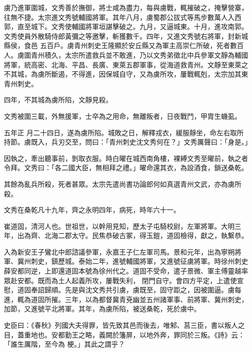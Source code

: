 \begin{pinyinscope}
 虜乃進軍圍城，文秀善於撫御，將士咸為盡力，每與虜戰，輒摧破之，掩擊營寨，往無不捷。太宗進文秀號輔國將軍。其年八月，虜蜀郡公拔式等馬步數萬人入西郭，直至城下。文秀使輔國將軍垣諶擊破之。九月，又逼城東。十月，進攻南郭。文秀使員外散騎侍郎黃彌之等邀擊，斬獲數千。四年，又進文秀號右將軍，封新城縣侯，食邑
 五百戶。虜青州刺史王隆顯於安丘縣又為軍主高崇仁所破，死者數百人。虜圍青州積久，太宗所遣救兵並不敢進，乃以文秀弟徵北中兵參軍文靜為輔國將軍，統高密、北海、平昌、長廣、東萊五郡軍事，從海道救青州。文靜至東萊之不其城，為虜所斷遏，不得進，因保城自守，又為虜所攻，屢戰輒剋，太宗加其東青州刺史。



 四年，不其城為虜所陷，文靜見殺。



 文秀被圍三載，外無援軍，士卒為之用命，無離叛者，日夜戰鬥，甲胄生蟣虱。



 五年正
 月二十四日，遂為虜所陷。城敗之日，解釋戎衣，緩服靜坐，命左右取所持節。虜既入，兵刃交至，問曰：「青州刺史沈文秀何在？」文秀厲聲曰：「身是。」



 因執之，牽出聽事前，剝取衣服。時白曜在城西南角樓，裸縛文秀至曜前，執之者令拜。文秀曰：「各二國大臣，無相拜之禮。」曜命還其衣，為設酒食，鎖送桑乾。



 其餘為亂兵所殺，死者甚眾。太宗先遣尚書功論郎何如真選青州文武，亦為虜所殺。



 文秀在桑乾凡十九年，齊之永明四年，病死，時年六十一。



 崔道固，清河人也。世祖世，以幹用見知，歷太子屯騎校尉，左軍將軍。大明三年，出為齊、北海二郡太守。民焦恭破古冢，得玉鎧，道固檢得，獻之，執繫恭。



 入為新安王子鸞北中郎諮議參軍，永嘉王子仁左軍司馬。景和元年，出為寧朔將軍、冀州刺史，鎮歷城。泰始二年，進號輔國將軍，又進號征虜將軍。時徐州刺史薛安都同逆，上即還道固本號為徐州代之。道固不受命，遣子景微、軍主傅靈越率眾赴安都。既而為土人起義所攻，屢戰失利，
 閉門自守。會四方平定，上遣使宣慰，道固奉詔歸順。先是與沈文秀共引虜，虜既至，固守距之，因被圍逼。虜每進，輒為道固所摧。三年，以為都督冀青兗幽並五州諸軍事、前將軍、冀州刺史，加節，又進號平北將軍。其年，為虜所陷，被送桑乾，死於虜中。



 史臣曰：《春秋》列國大夫得罪，皆先致其邑而後去，唯邾、莒三臣，書以叛人之目，蓋重地也。安都勤王之略，義闕於籓屏，以地外奔，罪同於三叛。《詩》云：「誰生厲階，至今為
 梗。」其此之謂乎？



\end{pinyinscope}